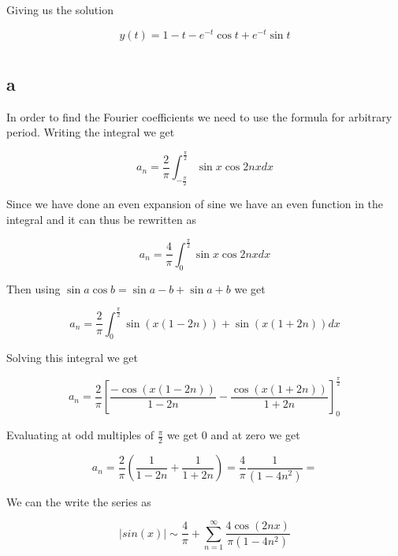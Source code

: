 \documentclass[a4paper]{article}
\begin{document}
Giving us the solution

\begin{equation}
    y(t) = 1-t-e^{-t}\cos{t} + e^{-t}\sin{t}
\end{equation}

\section{}

\subsection*{a}
In order to find the Fourier coefficients we need to use the formula for arbitrary period. Writing the integral we get

\begin{equation}
    a_n = \frac{2}{\pi} \int_{-\frac{\pi}{2}}^\frac{\pi}{2} \sin{x}\cos{2nx} dx
\end{equation}

Since we have done an even expansion of sine we have an even function in the integral and it can thus be rewritten as

\begin{equation}
    a_n = \frac{4}{\pi} \int_0^\frac{\pi}{2} \sin{x}\cos{2nx} dx
\end{equation}

Then using $\sin{a}\cos{b} = \sin{a-b} + \sin{a+b}$ we get

\begin{equation}
    a_n = \frac{2}{\pi} \int_0^\frac{\pi}{2} \sin{(x(1-2n))} + \sin{(x(1+2n))} dx
\end{equation}

Solving this integral we get

\begin{equation}
    a_n = \frac{2}{\pi} \left [ \frac{-\cos{(x(1-2n))}}{1-2n} - \frac{\cos{(x(1+2n))}}{1+2n} \right ]_0^{\frac{\pi}{2}}
\end{equation}

Evaluating at odd multiples of $\frac{\pi}{2}$ we get 0 and at zero we get

\begin{equation}
    a_n = \frac{2}{\pi} \left ( \frac{1}{1-2n} + \frac{1}{1+2n} \right ) = \frac{4}{\pi} \frac{1}{(1-4n^2)} = 
\end{equation}

We can the write the series as 

\begin{equation}
    |sin(x)| \sim \frac{4}{\pi} + \sum_{n=1}^\infty \frac{4\cos(2nx)}{\pi(1-4n^2)}
\end{equation}
\end{document}
